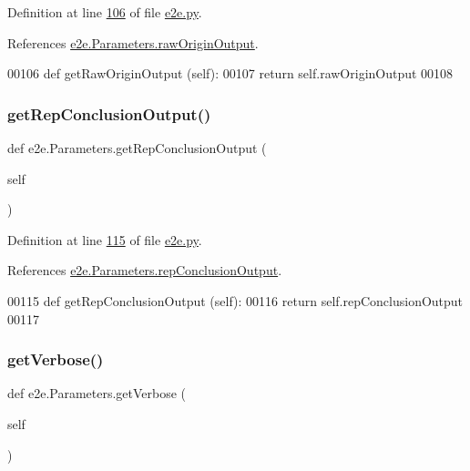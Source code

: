 Definition at line \hyperlink{e2e_8py_source_l00106}{106} of file \hyperlink{e2e_8py_source}{e2e.\+py}.



References \hyperlink{e2e_8py_source_l00104}{e2e.\+Parameters.\+raw\+Origin\+Output}.


\begin{DoxyCode}
00106     \textcolor{keyword}{def }getRawOriginOutput (self):
00107         \textcolor{keywordflow}{return} self.rawOriginOutput 
00108 
\end{DoxyCode}
\mbox{\label{classe2e_1_1_parameters_a54d1dd9d1af9541d3347766e06df65ca}} 
\subsubsection{\texorpdfstring{get\+Rep\+Conclusion\+Output()}{getRepConclusionOutput()}}
{\footnotesize\ttfamily def e2e.\+Parameters.\+get\+Rep\+Conclusion\+Output (\begin{DoxyParamCaption}\item[{}]{self }\end{DoxyParamCaption})}



Definition at line \hyperlink{e2e_8py_source_l00115}{115} of file \hyperlink{e2e_8py_source}{e2e.\+py}.



References \hyperlink{e2e_8py_source_l00039}{e2e.\+Parameters.\+rep\+Conclusion\+Output}.


\begin{DoxyCode}
00115     \textcolor{keyword}{def }getRepConclusionOutput (self):
00116         \textcolor{keywordflow}{return} self.repConclusionOutput 
00117     
\end{DoxyCode}
\mbox{\label{classe2e_1_1_parameters_a1e5e7e1986b641b01d4c24690a6d48eb}} 
\subsubsection{\texorpdfstring{get\+Verbose()}{getVerbose()}}
{\footnotesize\ttfamily def e2e.\+Parameters.\+get\+Verbose (\begin{DoxyParamCaption}\item[{}]{self }\end{DoxyParamCaption})}




